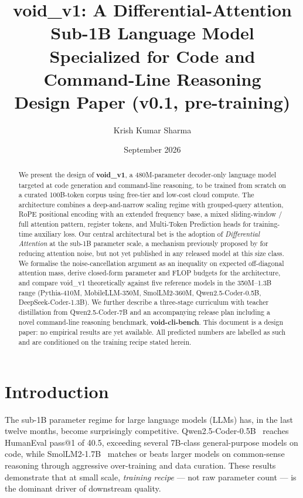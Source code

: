 \documentclass[11pt,a4paper]{article}
\title{\textbf{void\_v1}: A Differential-Attention Sub-1B Language Model \\
       Specialized for Code and Command-Line Reasoning \\[0.5em]
       \large Design Paper (v0.1, pre-training)}
\author{Krish Kumar Sharma}
\date{September 2026}
\theoremstyle{definition}
\theoremstyle{remark}
\begin{document}
\maketitle

\begin{abstract}
We present the design of \textbf{void\_v1}, a 480M-parameter decoder-only
language model targeted at code generation and command-line reasoning, to be
trained from scratch on a curated 100B-token corpus using free-tier and
low-cost cloud compute. The architecture combines a deep-and-narrow scaling
regime with grouped-query attention, RoPE positional encoding with an extended
frequency base, a mixed sliding-window / full attention pattern, register
tokens, and Multi-Token Prediction heads for training-time auxiliary loss. Our
central architectural bet is the adoption of \emph{Differential Attention} at
the sub-1B parameter scale, a mechanism previously proposed by
\citet{ye2024differential} for reducing attention noise, but not yet published
in any released model at this size class. We formalise the noise-cancellation
argument as an inequality on expected off-diagonal attention mass, derive
closed-form parameter and FLOP budgets for the architecture, and compare
void\_v1 theoretically against five reference models in the 350M--1.3B range
(Pythia-410M, MobileLLM-350M, SmolLM2-360M, Qwen2.5-Coder-0.5B,
DeepSeek-Coder-1.3B). We further describe a three-stage curriculum with
teacher distillation from Qwen2.5-Coder-7B and an accompanying release plan
including a novel command-line reasoning benchmark, \textbf{void-cli-bench}.
This document is a design paper: no empirical results are yet available. All
predicted numbers are labelled as such and are conditioned on the training
recipe stated herein.
\end{abstract}

\tableofcontents
\vspace{1em}

\section{Introduction}

The sub-1B parameter regime for large language models (LLMs) has, in the
last twelve months, become surprisingly competitive.
Qwen2.5-Coder-0.5B~\citep{hui2024qwen25coder} reaches HumanEval pass@1 of
40.5, exceeding several 7B-class general-purpose models on code, while
SmolLM2-1.7B~\citep{allal2025smollm2} matches or beats larger models on
common-sense reasoning through aggressive over-training and data curation.
These results demonstrate that at small scale, \emph{training recipe} ---
not raw parameter count --- is the dominant driver of downstream quality.
\end{document}
